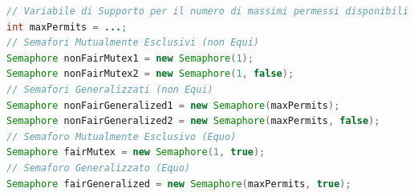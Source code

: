 \begin{lstlisting}[language=Java]
// Variabile di Supporto per il numero di massimi permessi disponibili
int maxPermits = ...;
// Semafori Mutualmente Esclusivi (non Equi)
Semaphore nonFairMutex1 = new Semaphore(1);
Semaphore nonFairMutex2 = new Semaphore(1, false);
// Semafori Generalizzati (non Equi)
Semaphore nonFairGeneralized1 = new Semaphore(maxPermits);
Semaphore nonFairGeneralized2 = new Semaphore(maxPermits, false);
// Semaforo Mutualmente Esclusivo (Equo)
Semaphore fairMutex = new Semaphore(1, true);
// Semaforo Generalizzato (Equo)
Semaphore fairGeneralized = new Semaphore(maxPermits, true);
\end{lstlisting}
